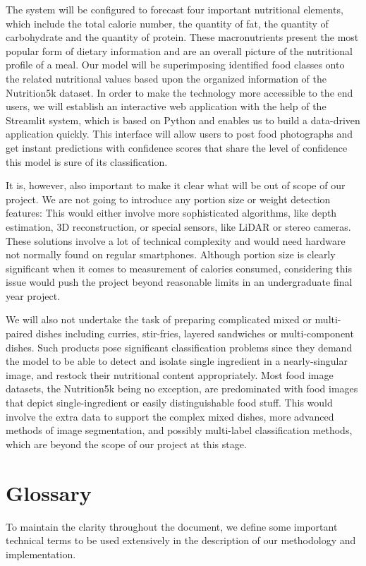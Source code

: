 \documentclass[12pt, openany]{report}
\begin{document}
The system will be configured to forecast four important nutritional elements, which include the total calorie number, the quantity of fat, the quantity of carbohydrate and the quantity of protein. These macronutrients present the most popular form of dietary information and are an overall picture of the nutritional profile of a meal. Our model will be superimposing identified food classes onto the related nutritional values based upon the organized information of the Nutrition5k dataset. In order to make the technology more accessible to the end users, we will establish an interactive web application with the help of the Streamlit system, which is based on Python and enables us to build a data-driven application quickly. This interface will allow users to post food photographs and get instant predictions with confidence scores that share the level of confidence this model is sure of its classification.

It is, however, also important to make it clear what will be out of scope of our project. We are not going to introduce any portion size or weight detection features: This would either involve more sophisticated algorithms, like depth estimation, 3D reconstruction, or special sensors, like LiDAR or stereo cameras. These solutions involve a lot of technical complexity and would need hardware not normally found on regular smartphones. Although portion size is clearly significant when it comes to measurement of calories consumed, considering this issue would push the project beyond reasonable limits in an undergraduate final year project.

We will also not undertake the task of preparing complicated mixed or multi-paired dishes including curries, stir-fries, layered sandwiches or multi-component dishes. Such products pose significant classification problems since they demand the model to be able to detect and isolate single ingredient in a nearly-singular image, and restock their nutritional content appropriately. Most food image datasets, the Nutrition5k being no exception, are predominated with food images that depict single-ingredient or easily distinguishable food stuff. This would involve the extra data to support the complex mixed dishes, more advanced methods of image segmentation, and possibly multi-label classification methods, which are beyond the scope of our project at this stage.

\section{Glossary}
To maintain the clarity throughout the document, we define some important technical terms to be used extensively in the description of our methodology and implementation.
\end{document}
